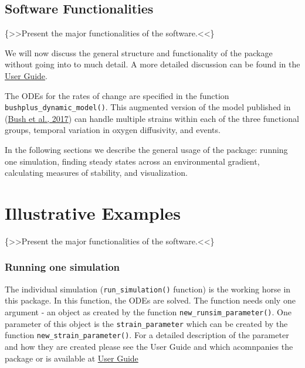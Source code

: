 \documentclass[]{elsarticle} %
\begin{document}
\hypertarget{software-functionalities}{%
\subsection{Software Functionalities}\label{software-functionalities}}

\{\textgreater\textgreater Present the major functionalities of the
software.\textless\textless\}

We will now discuss the general structure and functionality of the
package without going into to much detail. A more detailed discussion
can be found in the \href{LINK_NEEDED}{User Guide}.

The ODEs for the rates of change are specified in the function
\texttt{bushplus\_dynamic\_model()}. This augmented version of the model
published in (\protect\hyperlink{ref-Bush2017}{Bush et al., 2017}) can
handle multiple strains within each of the three functional groups,
temporal variation in oxygen diffusivity, and events.

In the following sections we describe the general usage of the package:
running one simulation, finding steady states across an environmental
gradient, calculating measures of stability, and visualization.

\hypertarget{illustrative-examples}{%
\section{Illustrative Examples}\label{illustrative-examples}}

\{\textgreater\textgreater Present the major functionalities of the
software.\textless\textless\}

\hypertarget{running-one-simulation}{%
\subsubsection{Running one simulation}\label{running-one-simulation}}

The individual simulation (\texttt{run\_simulation()} function) is the
working horse in this package. In this function, the ODEs are solved.
The function needs only one argument - an object as created by the
function \texttt{new\_runsim\_parameter()}. One parameter of this object
is the \texttt{strain\_parameter} which can be created by the function
\texttt{new\_strain\_parameter()}. For a detailed description of the
parameter and how they are created please see the User Guide and which
acomnpanies the package or is available at \href{@LINK_NEEDED}{User
Guide}
\end{document}
